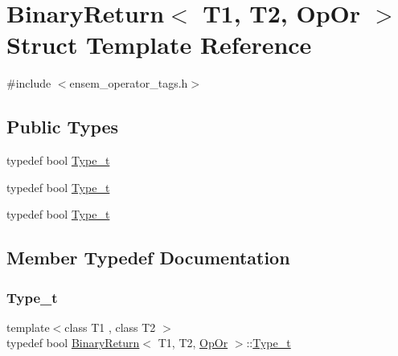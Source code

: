 \hypertarget{structBinaryReturn_3_01T1_00_01T2_00_01OpOr_01_4}{}\section{Binary\+Return$<$ T1, T2, Op\+Or $>$ Struct Template Reference}
\label{structBinaryReturn_3_01T1_00_01T2_00_01OpOr_01_4}


{\ttfamily \#include $<$ensem\+\_\+operator\+\_\+tags.\+h$>$}

\subsection*{Public Types}
\begin{DoxyCompactItemize}
\item 
typedef bool \mbox{\hyperlink{structBinaryReturn_3_01T1_00_01T2_00_01OpOr_01_4_a1680bdb61ac9ebe2b2be3fb7de1329b4}{Type\+\_\+t}}
\item 
typedef bool \mbox{\hyperlink{structBinaryReturn_3_01T1_00_01T2_00_01OpOr_01_4_a1680bdb61ac9ebe2b2be3fb7de1329b4}{Type\+\_\+t}}
\item 
typedef bool \mbox{\hyperlink{structBinaryReturn_3_01T1_00_01T2_00_01OpOr_01_4_a1680bdb61ac9ebe2b2be3fb7de1329b4}{Type\+\_\+t}}
\end{DoxyCompactItemize}


\subsection{Member Typedef Documentation}
\mbox{\label{structBinaryReturn_3_01T1_00_01T2_00_01OpOr_01_4_a1680bdb61ac9ebe2b2be3fb7de1329b4}} 
\subsubsection{\texorpdfstring{Type\_t}{Type\_t}\hspace{0.1cm}{\footnotesize\ttfamily [1/3]}}
{\footnotesize\ttfamily template$<$class T1 , class T2 $>$ \\
typedef bool \mbox{\hyperlink{structBinaryReturn}{Binary\+Return}}$<$ T1, T2, \mbox{\hyperlink{structOpOr}{Op\+Or}} $>$\+::\mbox{\hyperlink{structBinaryReturn_3_01T1_00_01T2_00_01OpOr_01_4_a1680bdb61ac9ebe2b2be3fb7de1329b4}{Type\+\_\+t}}}

